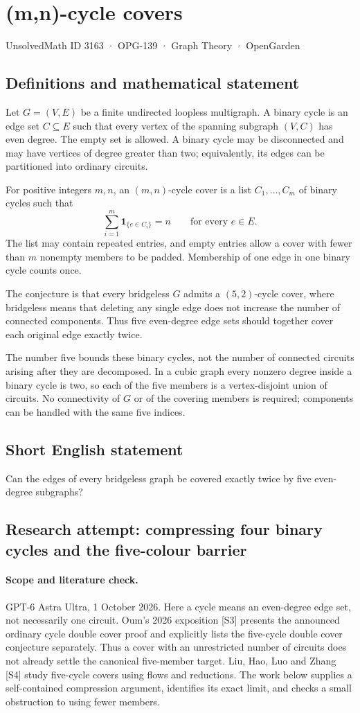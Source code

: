 \documentclass[11pt,a4paper]{article}
\begin{document}
\section*{(m,n)-cycle covers}\label{3163}
{\small UnsolvedMath ID 3163 · OPG-139 · Graph Theory · OpenGarden}
\subsection{Definitions and mathematical statement}
Let $G=(V,E)$ be a finite undirected loopless multigraph.
A binary cycle is an edge set $C\subseteq E$ such that every
vertex of the spanning subgraph $(V,C)$ has even degree.
The empty set is allowed. A binary cycle may be disconnected
and may have vertices of degree greater than two; equivalently,
its edges can be partitioned into ordinary circuits.

For positive integers $m,n$, an $(m,n)$-cycle cover is a list
$C_1,\ldots,C_m$ of binary cycles such that
\[
 \sum_{i=1}^m\mathbf1_{\{e\in C_i\}}=n
 \qquad\text{for every }e\in E.
\]
The list may contain repeated entries, and empty entries allow
a cover with fewer than $m$ nonempty members to be padded.
Membership of one edge in one binary cycle counts once.

The conjecture is that every bridgeless $G$ admits a
$(5,2)$-cycle cover, where bridgeless means that deleting any
single edge does not increase the number of connected
components. Thus five even-degree edge sets should together
cover each original edge exactly twice.

The number five bounds these binary cycles, not the number
of connected circuits arising after they are decomposed.
In a cubic graph every nonzero degree inside a binary cycle
is two, so each of the five members is a vertex-disjoint union
of circuits. No connectivity of $G$ or of the covering members
is required; components can be handled with the same five
indices.
\subsection{Short English statement}
Can the edges of every bridgeless graph be covered exactly twice by five even-degree subgraphs?
\subsection{Research attempt: compressing four binary cycles and the five-colour barrier}
\paragraph{Scope and literature check.}
GPT-6 Astra Ultra, 1 October 2026. Here a cycle means an even-degree
edge set, not necessarily one circuit. Oum's 2026 exposition [S3]
presents the announced ordinary cycle double cover proof and explicitly
lists the five-cycle double cover conjecture separately. Thus a cover
with an unrestricted number of circuits does not already settle the
canonical five-member target. Liu, Hao, Luo and Zhang [S4] study
five-cycle covers using flows and reductions. The work below supplies
a self-contained compression argument, identifies its exact limit, and
checks a small obstruction to using fewer members.
\end{document}
